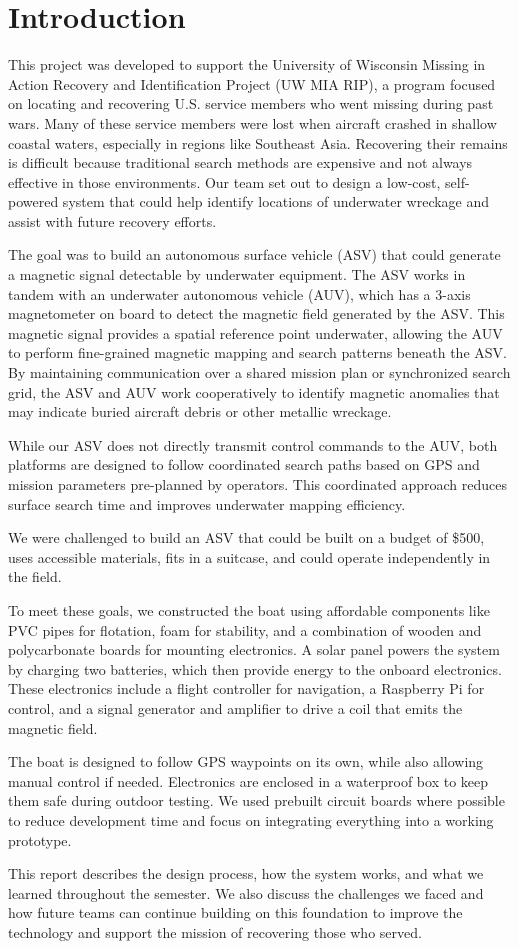 \section{Introduction}

This project was developed to support the University of Wisconsin Missing in Action Recovery and Identification Project (UW MIA RIP), a program focused on locating and recovering U.S. service members who went missing during past wars. Many of these service members were lost when aircraft crashed in shallow coastal waters, especially in regions like Southeast Asia. Recovering their remains is difficult because traditional search methods are expensive and not always effective in those environments. Our team set out to design a low-cost, self-powered system that could help identify locations of underwater wreckage and assist with future recovery efforts.

The goal was to build an autonomous surface vehicle (ASV) that could generate a magnetic signal detectable by underwater equipment. The ASV works in tandem with an underwater autonomous vehicle (AUV), which has a 3-axis magnetometer on board to detect the magnetic field generated by the ASV. This magnetic signal provides a spatial reference point underwater, allowing the AUV to perform fine-grained magnetic mapping and search patterns beneath the ASV. By maintaining communication over a shared mission plan or synchronized search grid, the ASV and AUV work cooperatively to identify magnetic anomalies that may indicate buried aircraft debris or other metallic wreckage. 

While our ASV does not directly transmit control commands to the AUV, both platforms are designed to follow coordinated search paths based on GPS and mission parameters pre-planned by operators. This coordinated approach reduces surface search time and improves underwater mapping efficiency.

We were challenged to build an ASV that could be built on a budget of \$500, uses accessible materials, fits in a suitcase, and could operate independently in the field.

To meet these goals, we constructed the boat using affordable components like PVC pipes for flotation, foam for stability, and a combination of wooden and polycarbonate boards for mounting electronics. A solar panel powers the system by charging two batteries, which then provide energy to the onboard electronics. These electronics include a flight controller for navigation, a Raspberry Pi for control, and a signal generator and amplifier to drive a coil that emits the magnetic field.

The boat is designed to follow GPS waypoints on its own, while also allowing manual control if needed. Electronics are enclosed in a waterproof box to keep them safe during outdoor testing. We used prebuilt circuit boards where possible to reduce development time and focus on integrating everything into a working prototype.

This report describes the design process, how the system works, and what we learned throughout the semester. We also discuss the challenges we faced and how future teams can continue building on this foundation to improve the technology and support the mission of recovering those who served.

